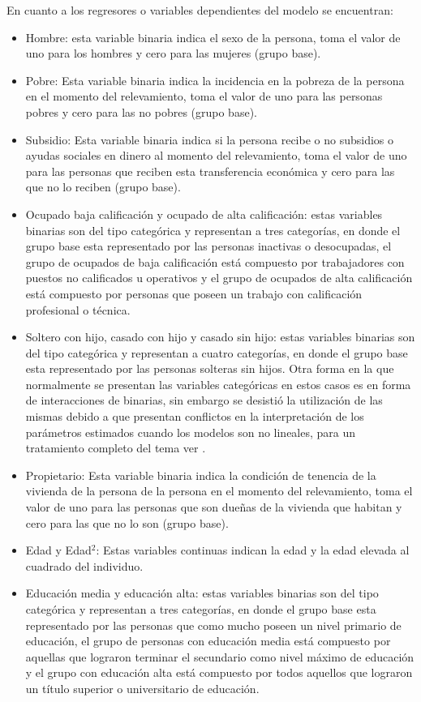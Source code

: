 \documentclass[12pt,a4paper]{article}
\begin{document}
En cuanto a los regresores o variables dependientes del modelo se encuentran:
\begin{itemize}
\item Hombre: esta variable binaria indica el sexo de la persona, toma el valor de uno para los hombres y cero para las mujeres (grupo base).
\item Pobre: Esta variable binaria indica la incidencia en la pobreza de la persona en el momento del relevamiento, toma el valor de uno para las personas pobres y cero para las no pobres (grupo base).
\item Subsidio: Esta variable binaria indica si la persona recibe o no  subsidios o ayudas sociales en dinero al momento del relevamiento, toma el valor de uno para las personas que reciben esta transferencia económica y cero para las que no lo reciben (grupo base).
\item Ocupado baja calificación y ocupado de alta calificación: estas variables binarias son del tipo categórica y representan a tres categorías, en donde el grupo base esta representado por las personas inactivas o desocupadas, el grupo de ocupados de baja calificación está compuesto por trabajadores con puestos no calificados u operativos y el grupo de ocupados de alta calificación está compuesto por personas que poseen un trabajo con calificación profesional o técnica.
\item Soltero con hijo, casado con hijo y casado sin hijo: estas variables binarias son del tipo categórica y representan a cuatro categorías, en donde el grupo base esta representado por las personas solteras sin hijos. Otra forma en la que normalmente se presentan las variables categóricas en estos casos es en forma de interacciones de binarias, sin embargo se desistió la utilización de las mismas debido a que presentan conflictos en la interpretación de los parámetros estimados cuando los modelos son no lineales, para un tratamiento completo del tema ver  \textcite{ai_interaction_2003}.
\item Propietario: Esta variable binaria indica la condición de tenencia de la vivienda de la persona de la persona en el momento del relevamiento, toma el valor de uno para las personas que son dueñas de la vivienda que habitan y cero para las que no lo son (grupo base).
\item Edad y Edad$^{2}$: Estas variables continuas indican la edad  y la edad elevada al cuadrado del individuo. 
\item Educación media y educación alta: estas variables binarias son del tipo categórica y representan a tres categorías, en donde el grupo base esta representado por las personas que como mucho poseen un nivel primario de educación, el grupo de personas con educación media está compuesto por aquellas que lograron terminar el secundario como nivel máximo de educación y el grupo con educación alta está compuesto por todos aquellos que lograron un título superior o universitario de educación.
\end{itemize}
\end{document}
